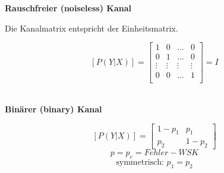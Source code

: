 \textbf{Rauschfreier (noiseless) Kanal} \\
\begin{minipage}{14cm}
	Die Kanalmatrix entspricht der Einheitsmatrix.

	$$ [P(Y | X)] = \begin{bmatrix}
           		1 & 0 & \ldots & 0\\
           		0 & 1 & \ldots & 0\\
           		\vdots & \vdots & \vdots & \vdots \\
           		0 & 0 & \ldots & 1\\
           \end{bmatrix} = I$$ \\
\end{minipage}
\begin{minipage}{4cm}
\begin{center}
\end{center}
\end{minipage}

\textbf{Binärer (binary) Kanal} \\
\begin{minipage}{14cm}
	$$ [P(Y | X)] = \begin{bmatrix}
           		1-p_1 & p_1 \\
           		p_2 & 1-p_2
           \end{bmatrix} $$
    $$ p = p_e = Fehler-WSK$$
    $$ \text{symmetrisch: } p_1 = p_2$$
\end{minipage}
\begin{minipage}{4cm}
\begin{center}
\end{center}
\end{minipage}

